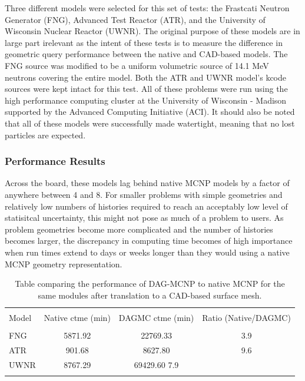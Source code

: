 \documentclass[12pt, a4paper]{article}
\begin{document}
Three different models were selected for this set of tests: the Frastcati Neutron Generator (FNG), Advanced Test Reactor (ATR), and the University of Wisconsin Nuclear Reactor (UWNR). The original purpose of these models are in large part irelevant as the intent of these tests is to measure the difference in geometric query performance between the native and CAD-based models. The FNG source was modified to be a uniform volumetric source of 14.1 MeV neutrons covering the entire model. Both the ATR and UWNR model's kcode sources were kept intact for this test. All of these problems were run using the high performance computing cluster at the University of Wisconsin - Madison supported by the Advanced Computing Initiative (ACI). It should also be noted that all of these models were successfully made watertight, meaning that no lost particles are expected.

\subsubsection{Performance Results}%

Across the board, these models lag behind native MCNP models by a factor of anywhere between 4 and 8. For smaller problems with simple geometries and relatively low numbers of histories required to reach an acceptably low level of statisitcal uncertainty, this might not pose as much of a problem to users. As problem geometries become more complicated and the number of histories becomes larger, the discrepancy in computing time becomes of high importance when run times extend to days or weeks longer than they would using a native MCNP geometry representation.

\begin{table}[H]
  \centering
  \caption{Table comparing the performance of DAG-MCNP to native MCNP for the same modules after translation to a CAD-based surface mesh.}
    \label{DAG-MCNP_performance}  
  \begin{tabular}{l c c c}
    \toprule \\
    Model & Native ctme (min) & DAGMC ctme (min) & Ratio (Native/DAGMC) \\
    \hline \\
    FNG &  5871.92 & 22769.33 & 3.9\\
    ATR &  901.68 & 8627.80 & 9.6 \\
    UWNR &  8767.29 & 69429.60 7.9\\
    \hline \\
  \end{tabular}
\end{table}
\end{document}
